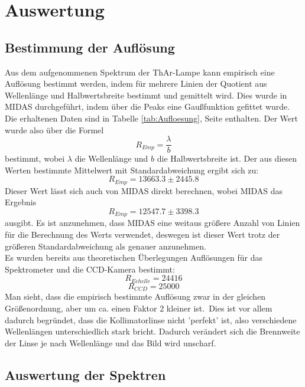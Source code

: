 \section{Auswertung}
\subsection{Bestimmung der Auflösung}
Aus dem aufgenommenen Spektrum der ThAr-Lampe kann empirisch eine Auflösung bestimmt werden, indem für mehrere Linien der Quotient aus Wellenlänge und Halbwertsbreite bestimmt und gemittelt wird. Dies wurde in MIDAS durchgeführt, indem über die Peaks eine Gaußfunktion gefittet wurde. Die erhaltenen Daten sind in Tabelle \ref{tab:Aufloesung}, Seite  \pageref{tab:Aufloesung} enthalten. Der Wert wurde also über die Formel
\begin{equation}
R_{Emp} = \frac{\lambda}{b}
\end{equation}
bestimmt, wobei $\lambda$ die Wellenlänge und $b$ die Halbwertsbreite ist. Der aus diesen Werten bestimmte Mittelwert mit Standardabweichung ergibt sich zu:
\begin{equation}
R_{Emp} = 13663.3 \pm 2445.8
\end{equation}
Dieser Wert lässt sich auch von MIDAS direkt berechnen, wobei MIDAS das Ergebnis
\begin{equation}
R_{Emp} = 12547.7 \pm 3398.3
\end{equation}
ausgibt. Es ist anzunehmen, dass MIDAS eine weitaus größere Anzahl von Linien für die Berechnung des Werts verwendet, deswegen ist dieser Wert trotz der größeren Standardabweichung als genauer anzunehmen.
\\
Es wurden bereits aus theoretischen Überlegungen Auflösungen für das Spektrometer und die CCD-Kamera bestimmt:
\begin{equation}
R_{Echelle} = 24416
\end{equation}
\begin{equation}
R_{CCD} =  25000
\end{equation}
Man sieht, dass die empirisch bestimmte Auflösung zwar in der gleichen Größenordnung, aber um ca. einen Faktor 2 kleiner ist.\
Dies ist vor allem dadurch begründet, dass die Kollimatorlinse nicht 'perfekt' ist, also verschiedene Wellenlängen unterschiedlich stark bricht. Dadurch verändert sich die Brennweite der Linse je nach Wellenlänge und das Bild wird unscharf.

\subsection{Auswertung der Spektren}
